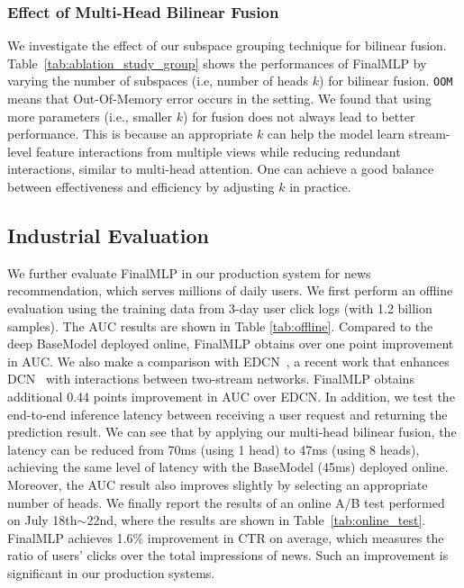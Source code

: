 \documentclass[letterpaper]{article} \usepackage{aaai23}  \usepackage{times}  \usepackage{helvet}  \usepackage{courier}  \usepackage[hyphens]{url}  \usepackage{graphicx} \urlstyle{rm} \def\UrlFont{\rm}  \usepackage{natbib}  \usepackage{caption} \frenchspacing  \setlength{\pdfpagewidth}{8.5in}  \setlength{\pdfpageheight}{11in}  \usepackage{algorithm}
\begin{document}
\subsubsection{Effect of Multi-Head Bilinear Fusion}
We investigate the effect of our subspace grouping technique for bilinear fusion. 
Table~\ref{tab:ablation_study_group} shows the performances of FinalMLP by varying the number of subspaces (i.e, number of heads $k$) for bilinear fusion. \texttt{OOM} means that Out-Of-Memory error occurs in the setting. We found that using more parameters (i.e., smaller $k$) for fusion does not always lead to better performance. This is because an appropriate $k$ can help the model learn stream-level feature interactions from multiple views while reducing redundant interactions, similar to multi-head attention. One can achieve a good balance between effectiveness and efficiency by adjusting $k$ in practice.


\subsection{Industrial Evaluation}
We further evaluate FinalMLP in our production system for news recommendation, which serves millions of daily users. We first perform an offline evaluation using the training data from 3-day user click logs (with 1.2 billion samples). The AUC results are shown in Table \ref{tab:offline}. Compared to the deep BaseModel deployed online, FinalMLP obtains over one point improvement in AUC. We also make a comparison with EDCN~\cite{EDCN}, a recent work that enhances DCN~\cite{DCN} with interactions between two-stream networks. FinalMLP obtains additional 0.44 points improvement in AUC over EDCN. 
In addition, we test the end-to-end inference latency between receiving a user request and returning the prediction result. We can see that by applying our multi-head bilinear fusion, the latency can be reduced from 70ms (using 1 head) to 47ms (using 8 heads), achieving the same level of latency with the BaseModel (45ms) deployed online. Moreover, the AUC result also improves slightly by selecting an appropriate number of heads. We finally report the results of an online A/B test performed on July 18th$\sim$22nd, where the  results are shown in Table~\ref{tab:online_test}. FinalMLP achieves 1.6\% improvement in CTR on average, which measures the ratio of users' clicks over the total impressions of news. Such an improvement is significant in our production systems.
\end{document}
